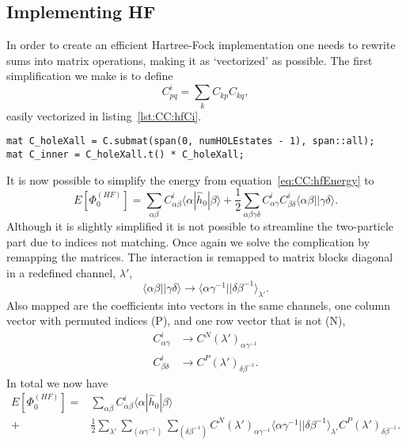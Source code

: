 \subsection{Implementing HF}
In order to create an efficient Hartree-Fock implementation one needs to rewrite sums into matrix operations, making it as `vectorized' as possible.
The first simplification we make is to define
\begin{equation}
C^{i}_{pq} = \sum_k C_{kp} C_{kq} ,
\end{equation}
easily vectorized in listing~\ref{lst:CC:hfCi}.
\begin{lstlisting}[float,label={lst:CC:hfCi},caption={Vectorized procedure to obtain $C^{i}$ (C\_inner).}]
mat C_holeXall = C.submat(span(0, numHOLEstates - 1), span::all);
mat C_inner = C_holeXall.t() * C_holeXall;
\end{lstlisting}
It is now possible to simplify the energy from equation~\ref{eq:CC:hfEnergy} to
\begin{equation}
E\left[\Phi_0^{(HF)}\right] 
=
\sum_{\alpha \beta} C^i_{\alpha\beta} \langle \alpha | \hat{h}_0 | \beta \rangle 
+
\frac{1}{2} \sum_{\alpha \beta \gamma \delta}
 C^i_{\alpha\gamma} C^i_{\beta\delta} \langle \alpha \beta || \gamma \delta \rangle .
\end{equation}
Although it is slightly simplified it is not possible to streamline the two-particle part due to indices not matching.
Once again we solve the complication by remapping the matrices.
The interaction is remapped to matrix blocks diagonal in a redefined channel, $\lambda'$,
\begin{equation}
\langle \alpha \beta || \gamma \delta \rangle
\rightarrow
\langle \alpha \gamma^{-1} || \delta \beta^{-1} \rangle_{\lambda'}.
\end{equation}
Also mapped are the coefficients into vectors in the same channels, one column vector with permuted indices (P), and one row vector that is not (N),
\begin{equation}
\label{eq:CC:mapHFcoeff}
\begin{split}
C^i_{\alpha \gamma} &\rightarrow C^{N}(\lambda')_{\alpha \gamma^{-1}}  \\
C^i_{\beta \delta} &\rightarrow C^{P}(\lambda')_{\delta \beta^{-1}} .
\end{split}
\end{equation}
In total we now have 
\begin{equation}
\label{eq:CC:hfEmatrixform}
\begin{split}
E\left[\Phi_0^{(HF)}\right] 
=&
\sum_{\alpha \beta} C^i_{\alpha\beta} \langle \alpha | \hat{h}_0 | \beta \rangle \\
+&
\frac{1}{2} \sum_{\lambda'} 
\sum_{(\alpha \gamma^{-1})}
\sum_{(\delta\beta^{-1})}
C^{N}(\lambda')_{\alpha \gamma^{-1}}
\langle \alpha \gamma^{-1} || \delta \beta^{-1} \rangle_{\lambda'}
C^{P}(\lambda')_{\delta \beta^{-1}}  .
\end{split}
\end{equation}
